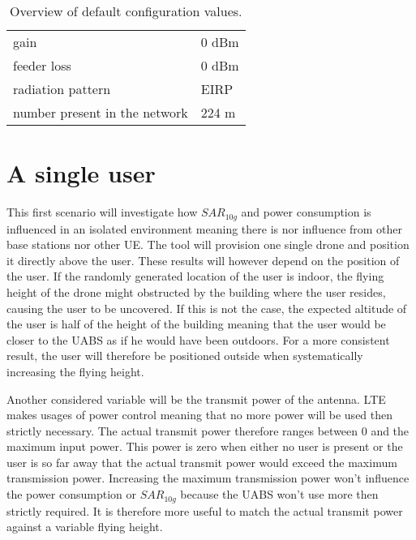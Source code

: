 \begin{table}[!htb]
\begin{tabular}[t]{ll}
        \hspace{3mm}  gain                      & 0 dBm   \\ 
        \hspace{3mm}  feeder loss               & 0 dBm   \\ 
        \hspace{3mm}  radiation pattern         & \acs{EIRP}  \\
        \hspace{3mm}  number present in the network         & 224 m  \\
        \toprule
\end{tabular}
\caption{Overview of default configuration values.}
\label{table:defaultconf}
\end{table}

\section{A single user}
\label{sec:s1}

This first scenario will investigate how $SAR_{10g}$ and power consumption is influenced in an isolated environment meaning there is nor influence 
from other base stations nor other \gls{UE}. The tool will provision one single drone and position it directly above the user.
These results will however depend on the position of the user. If the randomly generated location of the user is indoor, 
the flying height of the drone might obstructed by the building where the user resides, causing the user to be uncovered. If this is not the case,
the expected altitude of the user is half of the height of the building meaning that the user would be closer to the \gls{UABS} as 
if he would have been outdoors. For a more consistent result, the user will therefore be positioned outside when systematically 
increasing the flying height. 

Another considered variable will be the transmit power of the antenna.
\gls{LTE} makes usages of power control meaning that no more power will be used then strictly necessary. The actual 
transmit power therefore ranges between 0 and the maximum input power. This power is zero when either no user is 
present or the user is so far away that the actual transmit power would exceed the maximum transmission power.
Increasing the maximum transmission power won't influence the power consumption or $SAR_{10g}$ because the \gls{UABS} won't use more
then strictly required. It is therefore more useful to match the actual transmit power against a variable flying height.

